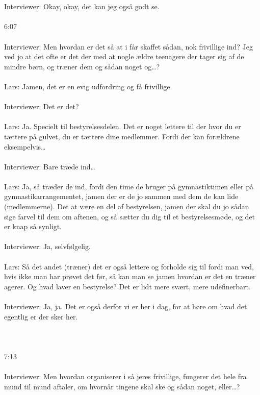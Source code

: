 \\\\
Interviewer: Okay, okay, det kan jeg også godt se.
\\\\
6:07
\\\\
Interviewer: Men hvordan er det så at i får skaffet sådan, nok frivillige ind? Jeg ved jo at det ofte er det der med at nogle ældre teenagere der tager sig af de mindre børn, og træner dem og sådan noget og…?
\\\\
Lars: Jamen, det er en evig udfordring og få frivillige.
\\\\
Interviewer: Det er det?
\\\\
Lars: Ja. Specielt til bestyrelsesdelen. Det er noget lettere til der hvor du er tættere på gulvet, du er tættere dine medlemmer. Fordi der kan forældrene eksempelvis…
\\\\
Interviewer: Bare træde ind…
\\\\
Lars: Ja, så træder de ind, fordi den time de bruger på gymnastiktimen eller på gymnastikarrangementet, jamen der er de jo sammen med dem de kan lide (medlemmerne). Det at være en del af bestyrelsen, jamen der skal du jo sådan sige farvel til dem om aftenen, og så sætter du dig til et bestyrelsesmøde, og det er knap så synligt.
\\\\
Interviewer: Ja, selvfølgelig.
\\\\
Lars: Så det andet (træner) det er også lettere og forholde sig til fordi man ved, hvis ikke man har prøvet det før, så kan man se jamen hvordan er det en træner agerer. Og hvad laver en bestyrelse? Det er lidt mere svært, mere udefinerbart.
\\\\
Interviewer: Ja, ja. Det er også derfor vi er her i dag, for at høre om hvad det egentlig er der sker her.
\\\\
[Ler sammen]
\\\\
7:13
\\\\
Interviewer: Men hvordan organiserer i så jeres frivillige, fungerer det hele fra mund til mund aftaler, om hvornår tingene skal ske og sådan noget, eller…?
